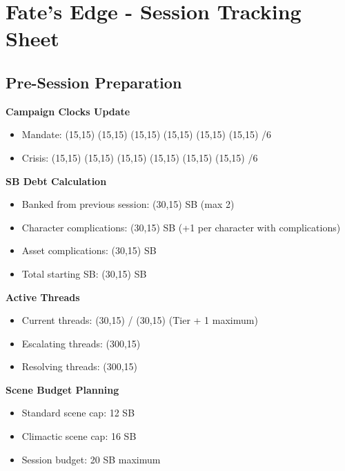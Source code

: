 \documentclass[11pt,letterpaper]{article}
\begin{document}
\section*{Fate's Edge - Session Tracking Sheet}

\subsection{Pre-Session Preparation}

\noindent\textbf{Campaign Clocks Update}
\begin{itemize}[leftmargin=*]
    \item Mandate: \framebox(15,15){} \framebox(15,15){} \framebox(15,15){} \framebox(15,15){} \framebox(15,15){} \framebox(15,15){} /6
    \item Crisis: \framebox(15,15){} \framebox(15,15){} \framebox(15,15){} \framebox(15,15){} \framebox(15,15){} \framebox(15,15){} /6
\end{itemize}

\vspace{0.3cm}

\noindent\textbf{SB Debt Calculation}
\begin{itemize}[leftmargin=*]
    \item Banked from previous session: \framebox(30,15){} SB (max 2)
    \item Character complications: \framebox(30,15){} SB (+1 per character with complications)
    \item Asset complications: \framebox(30,15){} SB
    \item Total starting SB: \framebox(30,15){} SB
\end{itemize}

\vspace{0.3cm}

\noindent\textbf{Active Threads}
\begin{itemize}[leftmargin=*]
    \item Current threads: \framebox(30,15){} / \framebox(30,15){} (Tier + 1 maximum)
    \item Escalating threads: \framebox(300,15){} 
    \item Resolving threads: \framebox(300,15){}
\end{itemize}

\vspace{0.3cm}

\noindent\textbf{Scene Budget Planning}
\begin{itemize}[leftmargin=*]
    \item Standard scene cap: 12 SB
    \item Climactic scene cap: 16 SB
    \item Session budget: 20 SB maximum
\end{itemize}
\end{document}
